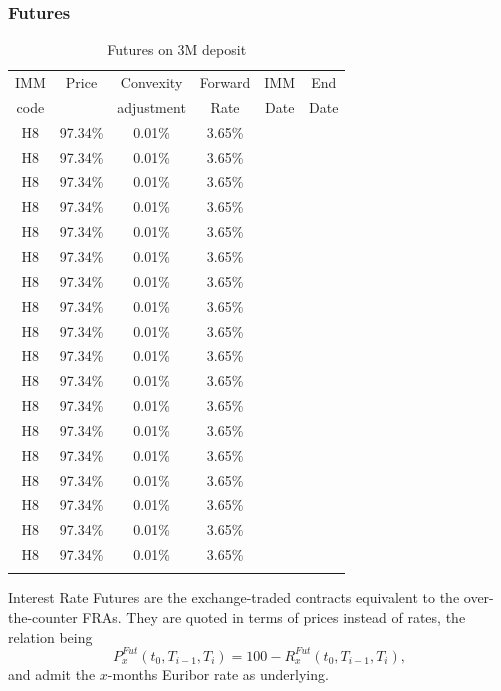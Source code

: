 \documentclass[11pt,reqno]{amsart}
\begin{document}
\subsubsection{\label{SecFutures}Futures}
\begin{table}[btp]
\label{tab:Futures}
\begin{tabular}{cccccc}
IMM  & Price & Convexity  & Forward & IMM  & End  \\
code &       & adjustment & Rate    & Date & Date \\
H8 & 97.34\% & 0.01\% & 3.65\% &  &  \\
H8 & 97.34\% & 0.01\% & 3.65\% &  &  \\
H8 & 97.34\% & 0.01\% & 3.65\% &  &  \\
H8 & 97.34\% & 0.01\% & 3.65\% &  &  \\
H8 & 97.34\% & 0.01\% & 3.65\% &  &  \\
H8 & 97.34\% & 0.01\% & 3.65\% &  &  \\
H8 & 97.34\% & 0.01\% & 3.65\% &  &  \\
H8 & 97.34\% & 0.01\% & 3.65\% &  &  \\
H8 & 97.34\% & 0.01\% & 3.65\% &  &  \\
H8 & 97.34\% & 0.01\% & 3.65\% &  &  \\
H8 & 97.34\% & 0.01\% & 3.65\% &  &  \\
H8 & 97.34\% & 0.01\% & 3.65\% &  &  \\
H8 & 97.34\% & 0.01\% & 3.65\% &  &  \\
H8 & 97.34\% & 0.01\% & 3.65\% &  &  \\
H8 & 97.34\% & 0.01\% & 3.65\% &  &  \\
H8 & 97.34\% & 0.01\% & 3.65\% &  &  \\
H8 & 97.34\% & 0.01\% & 3.65\% &  &  \\
H8 & 97.34\% & 0.01\% & 3.65\% &  &  \\
&  &  &  &  &
\end{tabular}%
\caption{Futures on 3M deposit}
\end{table}
Interest Rate Futures are the exchange-traded contracts equivalent to the over-the-counter FRAs. They are quoted in terms of prices instead of rates, the relation being
\begin{equation}
P^{Fut}_x\left(t_0,T_{i-1},T_i\right) = 100 - R^{Fut}_x\left(t_0,T_{i-1},T_i\right),
\label{eqn:futurepricerate}
\end{equation}
and admit the $x$-months Euribor rate as underlying.
\par
\end{document}
